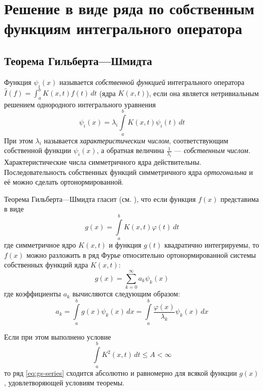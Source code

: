 \documentclass{article}
\numberwithin{equation}{section}
\renewcommand{\phi}{\varphi}
\renewcommand{\leq}{\leqslant}
\newcommand{\intl}{\int\limits}
\providecommand{\neword}{\emph}
\begin{document}
\clearpage
\section{Решение в виде ряда по собственным\\
  функциям интегрального оператора}

\subsection{Теорема Гильберта—Шмидта}
\label{sec:gs}

Функция $\psi_i(x)$ называется \neword{собственной функцией}
интегрального оператора $\hat{I}(f) = \int_a^b{K(x, t) f(t)\, dt}$
(ядра $K(x, t)$), если она является нетривиальным решением однородного
интегрального уравнения
\begin{equation}
  \label{eq:eigfun}
  \psi_i(x) = \lambda_i \intl_a^b{K(x, t) \psi_i(t)\, dt}
\end{equation}
При этом $\lambda_i$ называется \neword{характеристическим числом},
соответствующим собственной функции $\psi_i(x)$, а обратная величина
$\frac{1}{\lambda_i}$ — \neword{собственным числом}.
Характеристические числа симметричного ядра действительны.
Последовательность собственных функций симметричного ядра
\emph{ортогональна} и её можно сделать ортонормированной.

Теорема Гильберта—Шмидта гласит (см. \cite{krasnov75}), что если
функция $f(x)$ представима в виде
\begin{equation}
  g(x) = \intl_a^b{K(x, t) \phi(t)\, dt}
\end{equation}
где симметричное ядро $K(x, t)$ и функция $g(t)$ квадратично
интегрируемы, то $f(x)$ можно разложить в ряд Фурье относительно
ортонормированной системы собственных функций ядра $K(x, t)$:
\begin{equation}
  \label{eq:gs-series}
  g(x) = \sum_{k=0}^{\infty}a_k\psi_k(x)
\end{equation}
где коэффициенты $a_k$ вычисляются следующим образом:
\begin{equation}
  a_k = \intl_a^b{g(x) \psi_k(x)\,dx} = \intl_a^b{\frac{\phi(x)}{\lambda_k}\psi_k(x)\,dx}
\end{equation}

Если при этом выполнено условие
\begin{equation}
  \intl_a^b{K^2(x, t)\,dt} \leq A < \infty
\end{equation}
то ряд \eqref{eq:gs-series} сходится абсолютно и равномерно для всякой
функции $g(x)$, удовлетворяющей условиям теоремы.
\end{document}

